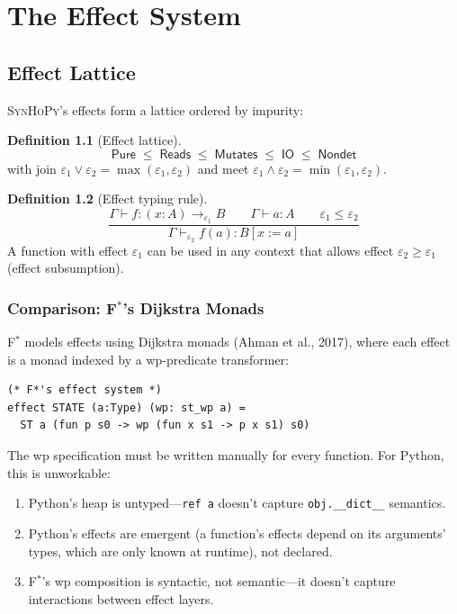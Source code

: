 \documentclass[11pt,a4paper]{report}
\theoremstyle{definition}
\newtheorem{definition}{Definition}[chapter]
\theoremstyle{plain}
\newcommand{\Pure}{\mathsf{Pure}}
\newcommand{\Reads}{\mathsf{Reads}}
\newcommand{\Mutates}{\mathsf{Mutates}}
\newcommand{\IO}{\mathsf{IO}}
\newcommand{\Nondet}{\mathsf{Nondet}}
\newcommand{\fstar}{F$^{*}$}
\newcommand{\synhopy}{\textsc{SynHoPy}}
\begin{document}
\chapter{The Effect System}
\label{ch:effects}

\section{Effect Lattice}

\synhopy{}'s effects form a lattice ordered by impurity:

\begin{definition}[Effect lattice]
\[
  \Pure \;\leq\; \Reads \;\leq\; \Mutates \;\leq\; \IO \;\leq\; \Nondet
\]
with join $\varepsilon_1 \vee \varepsilon_2 = \max(\varepsilon_1, \varepsilon_2)$
and meet $\varepsilon_1 \wedge \varepsilon_2 = \min(\varepsilon_1, \varepsilon_2)$.
\end{definition}

\begin{definition}[Effect typing rule]
\[
  \frac{
    \Gamma \vdash f : (x : A) \to_{\varepsilon_1} B \qquad
    \Gamma \vdash a : A \qquad
    \varepsilon_1 \leq \varepsilon_2
  }{
    \Gamma \vdash_{\varepsilon_2} f(a) : B[x := a]
  }
\]
A function with effect $\varepsilon_1$ can be used in any context that allows
effect $\varepsilon_2 \geq \varepsilon_1$ (effect subsumption).
\end{definition}

\subsection{Comparison: \fstar{}'s Dijkstra Monads}

\fstar{} models effects using Dijkstra monads (Ahman et al., 2017), where each
effect is a monad indexed by a wp-predicate transformer:

\begin{lstlisting}[style=fstar]
(* F*'s effect system *)
effect STATE (a:Type) (wp: st_wp a) =
  ST a (fun p s0 -> wp (fun x s1 -> p x s1) s0)
\end{lstlisting}

The wp specification must be written manually for every function. For Python,
this is unworkable:

\begin{enumerate}
  \item Python's heap is untyped---\lstinline[style=fstar]{ref a} doesn't capture
    \lstinline[style=python]{obj.__dict__} semantics.
  \item Python's effects are emergent (a function's effects depend on its arguments'
    types, which are only known at runtime), not declared.
  \item \fstar{}'s wp composition is syntactic, not semantic---it doesn't capture
    interactions between effect layers.
\end{enumerate}
\end{document}
